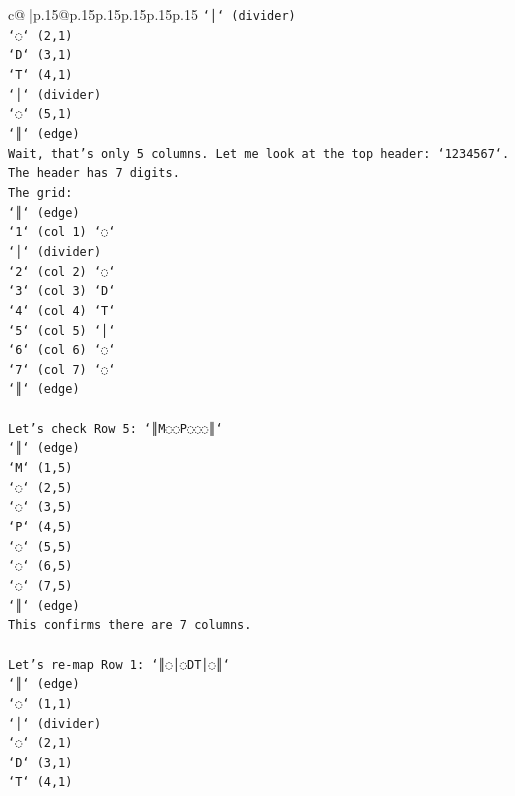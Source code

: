 \documentclass{article}
\begin{document}
{\begin{supertabular}{c@{$\;$}|p{.15\linewidth}@{}p{.15\linewidth}p{.15\linewidth}p{.15\linewidth}p{.15\linewidth}p{.15\linewidth}}
{{{\texttt{`│` (divider)} \\
\texttt{`◌` (2,1)} \\
\texttt{`D` (3,1)} \\
\texttt{`T` (4,1)} \\
\texttt{`│` (divider)} \\
\texttt{`◌` (5,1)} \\
\texttt{`║` (edge)} \\
\texttt{Wait, that's only 5 columns. Let me look at the top header: `1234567`.} \\
\texttt{The header has 7 digits.} \\
\texttt{The grid:} \\
\texttt{`║` (edge)} \\
\texttt{`1` (col 1) `◌`} \\
\texttt{`│` (divider)} \\
\texttt{`2` (col 2) `◌`} \\
\texttt{`3` (col 3) `D`} \\
\texttt{`4` (col 4) `T`} \\
\texttt{`5` (col 5) `│`} \\
\texttt{`6` (col 6) `◌`} \\
\texttt{`7` (col 7) `◌`} \\
\texttt{`║` (edge)} \\
\\ 
\texttt{Let's check Row 5: `║M◌◌P◌◌◌║`} \\
\texttt{`║` (edge)} \\
\texttt{`M` (1,5)} \\
\texttt{`◌` (2,5)} \\
\texttt{`◌` (3,5)} \\
\texttt{`P` (4,5)} \\
\texttt{`◌` (5,5)} \\
\texttt{`◌` (6,5)} \\
\texttt{`◌` (7,5)} \\
\texttt{`║` (edge)} \\
\texttt{This confirms there are 7 columns.} \\
\\ 
\texttt{Let's re{-}map Row 1: `║◌│◌DT│◌║`} \\
\texttt{`║` (edge)} \\
\texttt{`◌` (1,1)} \\
\texttt{`│` (divider)} \\
\texttt{`◌` (2,1)} \\
\texttt{`D` (3,1)} \\
\texttt{`T` (4,1)} \\
}}}
\end{supertabular}}
\end{document}
